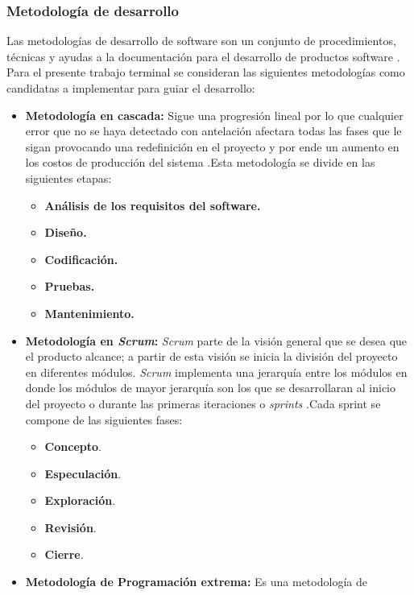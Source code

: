 \subsubsection{Metodología de desarrollo}
Las metodologías de desarrollo de software son un conjunto de procedimientos, 
técnicas y ayudas a la documentación para el desarrollo de productos software
\cite{Ref_metodologia}. Para el presente trabajo terminal se consideran las 
siguientes metodologías como candidatas a implementar para guiar el desarrollo:

\begin{itemize}
	\item \textbf{Metodología en cascada:} Sigue una progresión lineal por lo que 
	cualquier error que no se haya detectado con antelación afectara todas las 
	fases que le sigan provocando una redefinición en el proyecto y por ende un 
	aumento en los costos de producción del sistema \cite{Ref:CarCascada}.Esta 
	metodología se divide en las siguientes etapas:
		\begin{itemize}
			\item \textbf{Análisis de los requisitos del software.}
			\item \textbf{Diseño.}
			\item \textbf{Codificación.}
			\item \textbf{Pruebas.}
			\item \textbf{Mantenimiento.}
		\end{itemize}
	\item \textbf{Metodología en \textit{Scrum}:} \textit{Scrum} parte de la visión 
	general que se desea que el producto alcance; a partir de esta visión se inicia la 
	división del proyecto en diferentes módulos. \textit{Scrum} implementa una 
	jerarquía entre los módulos en donde los módulos de mayor jerarquía son los 
	que se desarrollaran al inicio del proyecto o durante las primeras iteraciones 
	o \textit{sprints} \cite{Ref_ScrumRef}.Cada sprint se compone de las siguientes 
	fases:
	\begin{itemize}
		\item \textbf{Concepto}.
		\item \textbf{Especulación}.
		\item \textbf{Exploración}.
		\item \textbf{Revisión}.
		\item \textbf{Cierre}\cite{Ref_ScrumGuia}. 
	\end{itemize}
	\item \textbf{Metodología de Programación extrema:} Es una metodología de 

\end{itemize}
